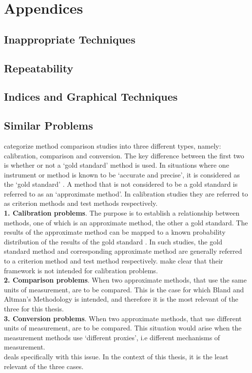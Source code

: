 


\chapter{Appendices}

\section{Inappropriate Techniques}



\section{Repeatability}



\section{Indices and Graphical Techniques}


\section{Similar Problems}
\citet{lewis1991} categorize method comparison studies into three
	different types, namely: calibration, comparison and conversion. The key difference between the first two is
	whether or not a `gold standard' method is used. In situations
	where one instrument or method is known to be `accurate and
	precise', it is considered as the `gold standard' \citep{lewis1991}. A
	method that is not considered to be a gold standard is referred to
	as an `approximate method'. In calibration studies they are
	referred to as criterion methods and test methods respectively.\\
    \smallskip
	\textbf{1. Calibration problems}. The purpose is to establish a
	relationship between methods, one of which is an approximate
	method, the other a gold standard. The results of the approximate
	method can be mapped to a known probability distribution of the
	results of the gold standard \citep{lewis1991}. In such studies, the
	gold standard method and corresponding approximate method are
	generally referred to a criterion method and test method respectively. \citet*{BA83} make clear that their framework is
	not intended for calibration problems.\\
	\smallskip \textbf{2. Comparison problems}. When two approximate methods, that use the same units of measurement, are to be
	compared. This is the case for which Bland and Altman's Methodology is intended, and therefore it is the most relevant of
	the three for this thesis.\\
	\smallskip \textbf{3. Conversion problems}. When two approximate methods, that use different units of measurement, are to be	compared. This situation would arise when the measurement methods
	use `different proxies', i.e different mechanisms of measurement.\\
	\smallskip
	\citet{lewis1991} deals specifically with this issue. In the context
	of this thesis, it is the least relevant of the three cases.
	
